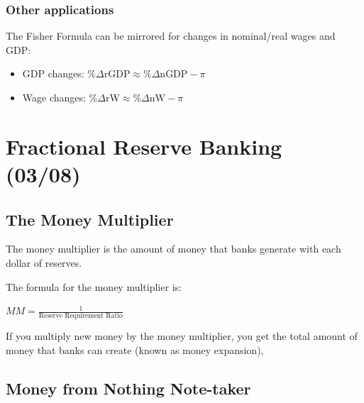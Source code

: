 \documentclass[
  letterpaper,
  DIV=11,
  numbers=noendperiod]{scrartcl}
\providecommand{\tightlist}{%
  \setlength{\itemsep}{0pt}\setlength{\parskip}{0pt}}\usepackage{longtable,booktabs,array}
\begin{document}
\subsubsection{Other applications}\label{other-applications}

The Fisher Formula can be mirrored for changes in nominal/real wages and
GDP:

\begin{itemize}
\tightlist
\item
  GDP changes:
  \(\% \Delta \text{rGDP} \approx \% \Delta \text{nGDP} - \pi\)
\item
  Wage changes:
  \(\% \Delta \text{rW} \approx \% \Delta \text{nW} - \pi\)
\end{itemize}

\section{Fractional Reserve Banking
(03/08)}\label{fractional-reserve-banking-0308}

\subsection{The Money Multiplier}\label{the-money-multiplier}

The money multiplier is the amount of money that banks generate with
each dollar of reserves.

The formula for the money multiplier is:

\(MM = \frac{1}{\text{Reserve Requirement Ratio}}\)

If you multiply new money by the money multiplier, you get the total
amount of money that banks can create (known as money expansion),

\subsection{Money from Nothing
Note-taker}\label{money-from-nothing-note-taker}
\end{document}
